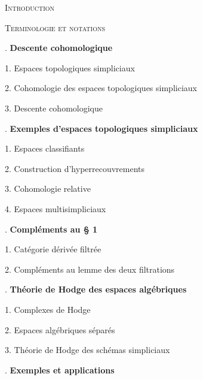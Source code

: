 \documentclass[11pt,leqno]{article}
\begin{document}
\begingroup
\small
\noindent\textsc{Introduction}\par
\medskip
\noindent\textsc{Terminologie et notations}\par
\medskip
{}. \textbf{Descente cohomologique}\par
\noindent\hspace*{1.5em}1. Espaces topologiques simpliciaux\par
\noindent\hspace*{1.5em}2. Cohomologie des espaces topologiques simpliciaux\par
\noindent\hspace*{1.5em}3. Descente cohomologique\par
\medskip
{}. \textbf{Exemples d’espaces topologiques simpliciaux}\par
\noindent\hspace*{1.5em}1. Espaces classifiants\par
\noindent\hspace*{1.5em}2. Construction d’hyperrecouvrements\par
\noindent\hspace*{1.5em}3. Cohomologie relative\par
\noindent\hspace*{1.5em}4. Espaces multisimpliciaux\par
\medskip
{}. \textbf{Compléments au § 1}\par
\noindent\hspace*{1.5em}1. Catégorie dérivée filtrée\par
\noindent\hspace*{1.5em}2. Compléments au lemme des deux filtrations\par
\medskip
{}. \textbf{Théorie de Hodge des espaces algébriques}\par
\noindent\hspace*{1.5em}1. Complexes de Hodge\par
\noindent\hspace*{1.5em}2. Espaces algébriques séparés\par
\noindent\hspace*{1.5em}3. Théorie de Hodge des schémas simpliciaux\par
\medskip
{}. \textbf{Exemples et applications}\par
\end{document}
